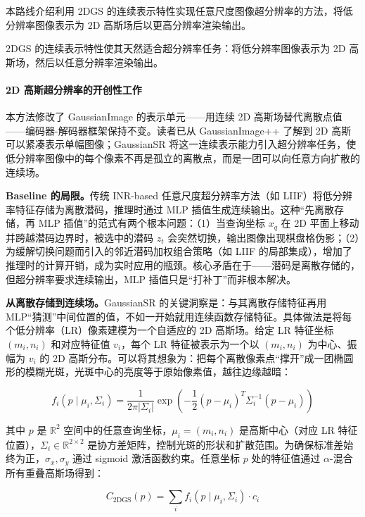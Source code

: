 本路线介绍利用 2DGS 的连续表示特性实现任意尺度图像超分辨率的方法，将低分辨率图像表示为 2D 高斯场后以更高分辨率渲染输出。

2DGS 的连续表示特性使其天然适合超分辨率任务：将低分辨率图像表示为 2D 高斯场，然后以任意分辨率渲染输出。

\paragraph{2D 高斯超分辨率的开创性工作}

本方法修改了 GaussianImage 的表示单元——用连续 2D 高斯场替代离散点值——编码器-解码器框架保持不变。读者已从 GaussianImage++ 了解到 2D 高斯可以紧凑表示单幅图像；GaussianSR 将这一连续表示能力引入超分辨率任务，使低分辨率图像中的每个像素不再是孤立的离散点，而是一团可以向任意方向扩散的连续场。

\textbf{Baseline 的局限。}传统 INR-based 任意尺度超分辨率方法（如 LIIF）将低分辨率特征存储为离散潜码，推理时通过 MLP 插值生成连续输出。这种``先离散存储，再 MLP 插值''的范式有两个根本问题：（1）当查询坐标 $x_q$ 在 2D 平面上移动并跨越潜码边界时，被选中的潜码 $z_t$ 会突然切换，输出图像出现棋盘格伪影；（2）为缓解切换问题而引入的邻近潜码加权组合策略（如 LIIF 的局部集成），增加了推理时的计算开销，成为实时应用的瓶颈。核心矛盾在于——潜码是离散存储的，但超分辨率要求连续输出，MLP 插值只是``打补丁''而非根本解决。

\textbf{从离散存储到连续场。}GaussianSR 的关键洞察是：与其离散存储特征再用 MLP``猜测''中间位置的值，不如一开始就用连续函数存储特征。具体做法是将每个低分辨率（LR）像素建模为一个自适应的 2D 高斯场。给定 LR 特征坐标 $(m_i, n_i)$ 和对应特征值 $v_i$，每个 LR 特征被表示为一个以 $(m_i, n_i)$ 为中心、振幅为 $v_i$ 的 2D 高斯分布。可以将其想象为：把每个离散像素点``撑开''成一团椭圆形的模糊光斑，光斑中心的亮度等于原始像素值，越往边缘越暗：

\begin{equation}
    f_i(p \mid \mu_i, \Sigma_i) = \frac{1}{2\pi|\Sigma_i|} \exp\!\left(-\frac{1}{2}(p-\mu_i)^T \Sigma_i^{-1} (p-\mu_i)\right)
\end{equation}

其中 $p$ 是 $\mathbb{R}^2$ 空间中的任意查询坐标，$\mu_i=(m_i, n_i)$ 是高斯中心（对应 LR 特征位置），$\Sigma_i \in \mathbb{R}^{2 \times 2}$ 是协方差矩阵，控制光斑的形状和扩散范围。为确保标准差始终为正，$\sigma_x, \sigma_y$ 通过 sigmoid 激活函数约束。任意坐标 $p$ 处的特征值通过 $\alpha$-混合所有重叠高斯场得到：

\begin{equation}
    C_{\text{2DGS}}(p) = \sum_i f_i(p \mid \mu_i, \Sigma_i) \cdot c_i
\end{equation}

